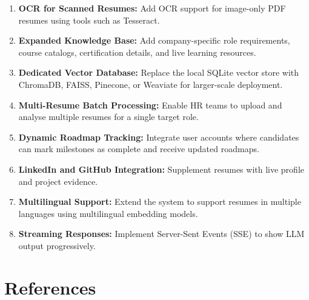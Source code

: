 \documentclass[12pt,a4paper]{report}
\begin{document}
\begin{enumerate}
  \item \textbf{OCR for Scanned Resumes:} Add OCR support for image-only PDF
        resumes using tools such as Tesseract.
  \item \textbf{Expanded Knowledge Base:} Add company-specific role requirements,
        course catalogs, certification details, and live learning resources.
  \item \textbf{Dedicated Vector Database:} Replace the local SQLite vector store
        with ChromaDB, FAISS, Pinecone, or Weaviate for larger-scale deployment.
  \item \textbf{Multi-Resume Batch Processing:} Enable HR teams to upload and
        analyse multiple resumes for a single target role.
  \item \textbf{Dynamic Roadmap Tracking:} Integrate user accounts where
        candidates can mark milestones as complete and receive updated roadmaps.
  \item \textbf{LinkedIn and GitHub Integration:} Supplement resumes with live
        profile and project evidence.
  \item \textbf{Multilingual Support:} Extend the system to support resumes in
        multiple languages using multilingual embedding models.
  \item \textbf{Streaming Responses:} Implement Server-Sent Events (SSE) to show
        LLM output progressively.
\end{enumerate}

\chapter*{References}
\end{document}
